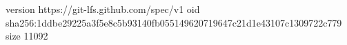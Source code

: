 version https://git-lfs.github.com/spec/v1
oid sha256:1ddbe29225a3f5e8c5b93140fb055149620719647c21d1e43107c1309722c779
size 11092
